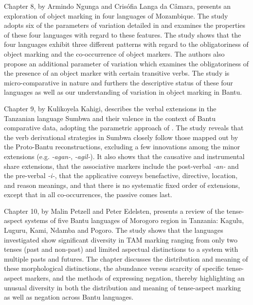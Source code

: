 \documentclass[output=paper]{langscibook}
\begin{document}
Chapter 8, by Armindo Ngunga and Crisófia Langa da Câmara, presents an exploration of object marking in four languages of Mozambique. The study adopts six of the parameters of variation detailed in \citet{MartenKula2012} and examines the properties of these four languages with regard to these features. The study shows that the four languages exhibit three different patterns with regard to the obligatoriness of object marking and the co-occurrence of object markers. The authors also propose an additional parameter of variation which examines the obligatoriness of the presence of an object marker with certain transitive verbs. The study is micro-comparative in nature and furthers the descriptive status of these four languages as well as our understanding of variation in object marking in Bantu.

Chapter 9, by Kulikoyela Kahigi, describes the verbal extensions in the Tanzanian language Sumbwa and their valence in the context of Bantu comparative data, adopting the parametric approach of \citet{GuéroisEtAl2017}. The study reveals that the verb derivational strategies in Sumbwa closely follow those mapped out by the Proto-Bantu reconstructions, excluding a few innovations among the minor extensions (e.g. \textit{-agan-}, \textit{-agil-}). It also shows that the causative and instrumental share extensions, that the associative markers include the post-verbal \textit{-an-} and the pre-verbal \textit{-i-}, that the applicative conveys benefactive, directive, location, and reason meanings, and that there is no systematic fixed order of extensions, except that in all co-occurrences, the passive comes last.

Chapter 10, by Malin Petzell and Peter Edelsten, presents a review of the tense-aspect systems of five Bantu languages of Morogoro region in Tanzania: Kagulu, Luguru, Kami, Ndamba and Pogoro. The study shows that the languages investigated show significant diversity in TAM marking ranging from only two tenses (past and non-past) and limited aspectual distinctions to a system with multiple pasts and futures. The chapter discusses the distribution and meaning of these morphological distinctions, the abundance versus scarcity of specific tense-aspect markers, and the methods of expressing negation, thereby highlighting an unusual diversity in both the distribution and meaning of tense-aspect marking as well as negation across Bantu languages. 
\end{document}
